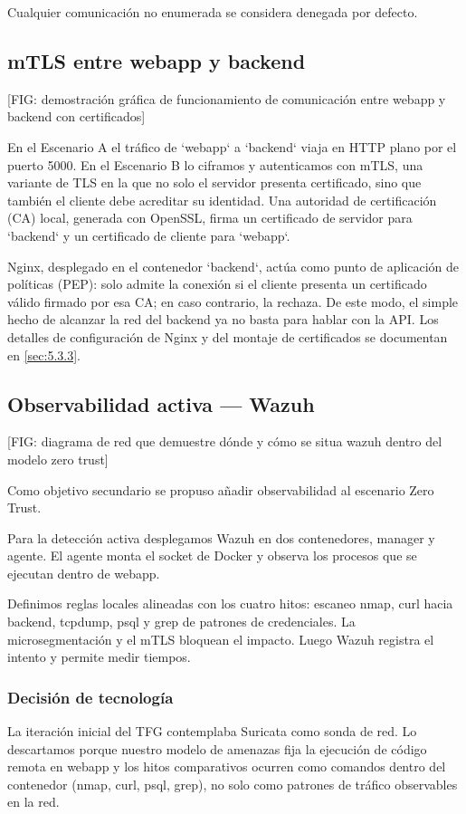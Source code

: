         Cualquier comunicación no enumerada se considera denegada por defecto.
        
        \subsection{mTLS entre webapp y backend}
        [FIG: demostración gráfica de funcionamiento de comunicación entre webapp y backend con certificados]
        
        En el Escenario A el tráfico de `webapp` a `backend` viaja en HTTP plano por el puerto 5000. En el Escenario B lo ciframos y autenticamos con mTLS, una variante de TLS en la que no solo el servidor presenta certificado, sino que también el cliente debe acreditar su identidad. Una autoridad de certificación (CA) local, generada con OpenSSL, firma un certificado de servidor para `backend` y un certificado de cliente para `webapp`.
        
        Nginx, desplegado en el contenedor `backend`, actúa como punto de aplicación de políticas (PEP): solo admite la conexión si el cliente presenta un certificado válido firmado por esa CA; en caso contrario, la rechaza. De este modo, el simple hecho de alcanzar la red del backend ya no basta para hablar con la API. Los detalles de configuración de Nginx y del montaje de certificados se documentan en \cref{sec:5.3.3}.
        
        \subsection{Observabilidad activa — Wazuh}
        [FIG: diagrama de red que demuestre dónde y cómo se situa wazuh dentro del modelo zero trust]
        
        Como objetivo secundario se propuso añadir observabilidad al escenario Zero Trust.
        
        Para la detección activa desplegamos Wazuh en dos contenedores, manager y agente. El agente monta el socket de Docker y observa los procesos que se ejecutan dentro de webapp.

        Definimos reglas locales alineadas con los cuatro hitos: escaneo nmap, curl hacia backend, tcpdump, psql y grep de patrones de credenciales. La microsegmentación y el mTLS bloquean el impacto. Luego Wazuh registra el intento y permite medir tiempos. 

    \subsubsection{Decisión de tecnología}
    La iteración inicial del TFG contemplaba Suricata como sonda de red. Lo descartamos porque nuestro modelo de amenazas fija la ejecución de código remota en webapp y los hitos comparativos ocurren como comandos dentro del contenedor (nmap, curl, psql, grep), no solo como patrones de tráfico observables en la red.


